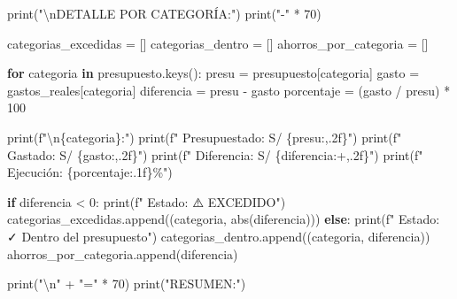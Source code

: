 \documentclass[
  doc,
  floatsintext,
  longtable,
  a4paper,
  nolmodern,
  notxfonts,
  notimes,
  12pt,
  colorlinks=true,linkcolor=blue,citecolor=blue,urlcolor=blue]{apa7}
\newenvironment{Shaded}{\begin{snugshade}}{\end{snugshade}}
\newcommand{\BuiltInTok}[1]{\textcolor[rgb]{0.00,0.23,0.31}{#1}}
\newcommand{\CharTok}[1]{\textcolor[rgb]{0.13,0.47,0.30}{#1}}
\newcommand{\ControlFlowTok}[1]{\textcolor[rgb]{0.00,0.23,0.31}{\textbf{#1}}}
\newcommand{\DecValTok}[1]{\textcolor[rgb]{0.68,0.00,0.00}{#1}}
\newcommand{\KeywordTok}[1]{\textcolor[rgb]{0.00,0.23,0.31}{\textbf{#1}}}
\newcommand{\NormalTok}[1]{\textcolor[rgb]{0.00,0.23,0.31}{#1}}
\newcommand{\OperatorTok}[1]{\textcolor[rgb]{0.37,0.37,0.37}{#1}}
\newcommand{\SpecialCharTok}[1]{\textcolor[rgb]{0.37,0.37,0.37}{#1}}
\newcommand{\SpecialStringTok}[1]{\textcolor[rgb]{0.13,0.47,0.30}{#1}}
\newcommand{\StringTok}[1]{\textcolor[rgb]{0.13,0.47,0.30}{#1}}
\begin{document}
\begin{Shaded}
\begin{Highlighting}[]
\BuiltInTok{print}\NormalTok{(}\StringTok{"}\CharTok{\textbackslash{}n}\StringTok{DETALLE POR CATEGORÍA:"}\NormalTok{)}
\BuiltInTok{print}\NormalTok{(}\StringTok{"{-}"} \OperatorTok{*} \DecValTok{70}\NormalTok{)}

\NormalTok{categorias\_excedidas }\OperatorTok{=}\NormalTok{ []}
\NormalTok{categorias\_dentro }\OperatorTok{=}\NormalTok{ []}
\NormalTok{ahorros\_por\_categoria }\OperatorTok{=}\NormalTok{ []}

\ControlFlowTok{for}\NormalTok{ categoria }\KeywordTok{in}\NormalTok{ presupuesto.keys():}
\NormalTok{    presu }\OperatorTok{=}\NormalTok{ presupuesto[categoria]}
\NormalTok{    gasto }\OperatorTok{=}\NormalTok{ gastos\_reales[categoria]}
\NormalTok{    diferencia }\OperatorTok{=}\NormalTok{ presu }\OperatorTok{{-}}\NormalTok{ gasto}
\NormalTok{    porcentaje }\OperatorTok{=}\NormalTok{ (gasto }\OperatorTok{/}\NormalTok{ presu) }\OperatorTok{*} \DecValTok{100}
    
    \BuiltInTok{print}\NormalTok{(}\SpecialStringTok{f"}\CharTok{\textbackslash{}n}\SpecialCharTok{\{}\NormalTok{categoria}\SpecialCharTok{\}}\SpecialStringTok{:"}\NormalTok{)}
    \BuiltInTok{print}\NormalTok{(}\SpecialStringTok{f"  Presupuestado: S/ }\SpecialCharTok{\{}\NormalTok{presu}\SpecialCharTok{:,.2f\}}\SpecialStringTok{"}\NormalTok{)}
    \BuiltInTok{print}\NormalTok{(}\SpecialStringTok{f"  Gastado: S/ }\SpecialCharTok{\{}\NormalTok{gasto}\SpecialCharTok{:,.2f\}}\SpecialStringTok{"}\NormalTok{)}
    \BuiltInTok{print}\NormalTok{(}\SpecialStringTok{f"  Diferencia: S/ }\SpecialCharTok{\{}\NormalTok{diferencia}\SpecialCharTok{:+,.2f\}}\SpecialStringTok{"}\NormalTok{)}
    \BuiltInTok{print}\NormalTok{(}\SpecialStringTok{f"  Ejecución: }\SpecialCharTok{\{}\NormalTok{porcentaje}\SpecialCharTok{:.1f\}}\SpecialStringTok{\%"}\NormalTok{)}
    
    \ControlFlowTok{if}\NormalTok{ diferencia }\OperatorTok{\textless{}} \DecValTok{0}\NormalTok{:}
        \BuiltInTok{print}\NormalTok{(}\SpecialStringTok{f"  Estado: ⚠️ EXCEDIDO"}\NormalTok{)}
\NormalTok{        categorias\_excedidas.append((categoria, }\BuiltInTok{abs}\NormalTok{(diferencia)))}
    \ControlFlowTok{else}\NormalTok{:}
        \BuiltInTok{print}\NormalTok{(}\SpecialStringTok{f"  Estado: ✓ Dentro del presupuesto"}\NormalTok{)}
\NormalTok{        categorias\_dentro.append((categoria, diferencia))}
\NormalTok{        ahorros\_por\_categoria.append(diferencia)}

\BuiltInTok{print}\NormalTok{(}\StringTok{"}\CharTok{\textbackslash{}n}\StringTok{"} \OperatorTok{+} \StringTok{"="} \OperatorTok{*} \DecValTok{70}\NormalTok{)}
\BuiltInTok{print}\NormalTok{(}\StringTok{"RESUMEN:"}\NormalTok{)}


\end{Highlighting}
\end{Shaded}
\end{document}
